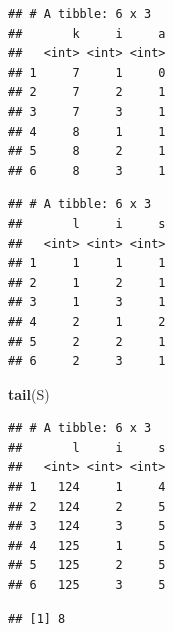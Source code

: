 \documentclass[]{book}
\newenvironment{Shaded}{\begin{snugshade}}{\end{snugshade}}
\newcommand{\KeywordTok}[1]{\textcolor[rgb]{0.13,0.29,0.53}{\textbf{#1}}}
\newcommand{\StringTok}[1]{\textcolor[rgb]{0.31,0.60,0.02}{#1}}
\newcommand{\CommentTok}[1]{\textcolor[rgb]{0.56,0.35,0.01}{\textit{#1}}}
\newcommand{\OperatorTok}[1]{\textcolor[rgb]{0.81,0.36,0.00}{\textbf{#1}}}
\newcommand{\NormalTok}[1]{#1}
\begin{document}
\begin{verbatim}
## # A tibble: 6 x 3
##       k     i     a
##   <int> <int> <int>
## 1     7     1     0
## 2     7     2     1
## 3     7     3     1
## 4     8     1     1
## 5     8     2     1
## 6     8     3     1
\end{verbatim}

\begin{Shaded}
\end{Shaded}

\begin{verbatim}
## # A tibble: 6 x 3
##       l     i     s
##   <int> <int> <int>
## 1     1     1     1
## 2     1     2     1
## 3     1     3     1
## 4     2     1     2
## 5     2     2     1
## 6     2     3     1
\end{verbatim}

\begin{Shaded}
\begin{Highlighting}[]
\KeywordTok{tail}\NormalTok{(S)}
\end{Highlighting}
\end{Shaded}

\begin{verbatim}
## # A tibble: 6 x 3
##       l     i     s
##   <int> <int> <int>
## 1   124     1     4
## 2   124     2     5
## 3   124     3     5
## 4   125     1     5
## 5   125     2     5
## 6   125     3     5
\end{verbatim}

\begin{Shaded}
\end{Shaded}

\begin{verbatim}
## [1] 8
\end{verbatim}

\begin{Shaded}
\end{Shaded}
\end{document}
